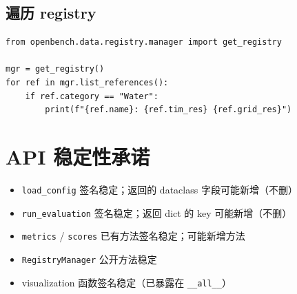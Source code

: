\subsection{遍历 registry}

\begin{verbatim}
from openbench.data.registry.manager import get_registry

mgr = get_registry()
for ref in mgr.list_references():
    if ref.category == "Water":
        print(f"{ref.name}: {ref.tim_res} {ref.grid_res}")
\end{verbatim}

\section{API 稳定性承诺}

\begin{itemize}
  \item \texttt{load\_config} 签名稳定；返回的 dataclass 字段可能新增（不删）
  \item \texttt{run\_evaluation} 签名稳定；返回 dict 的 key 可能新增（不删）
  \item \texttt{metrics} / \texttt{scores} 已有方法签名稳定；可能新增方法
  \item \texttt{RegistryManager} 公开方法稳定
  \item visualization 函数签名稳定（已暴露在 \texttt{\_\_all\_\_}）
\end{itemize}

